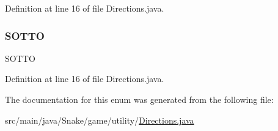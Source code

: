 Definition at line 16 of file Directions.\+java.

\mbox{\label{enum_snake_1_1game_1_1utility_1_1_directions_a6fcef6b13f7f1deeda7fee7cf15280be}} 
\subsubsection{\texorpdfstring{S\+O\+T\+TO}{SOTTO}}
{\footnotesize\ttfamily S\+O\+T\+TO}



Definition at line 16 of file Directions.\+java.



The documentation for this enum was generated from the following file\+:\begin{DoxyCompactItemize}
\item 
src/main/java/\+Snake/game/utility/\mbox{\hyperlink{_directions_8java}{Directions.\+java}}\end{DoxyCompactItemize}
